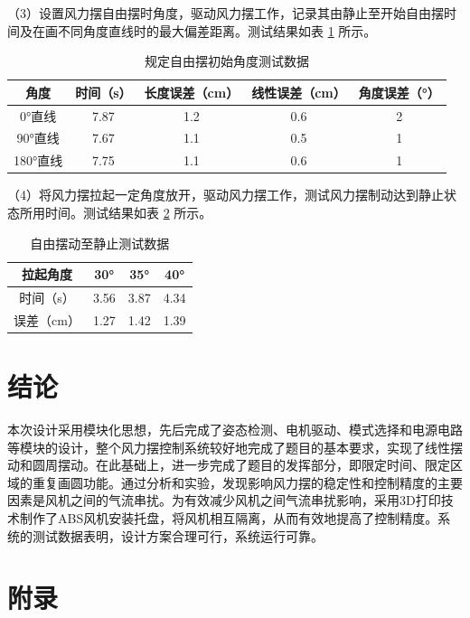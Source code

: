 \documentclass[zihao=-4,fontset=none]{ctexart}
\begin{document}
（3）设置风力摆自由摆时角度，驱动风力摆工作，记录其由静止至开始自由摆时间及在画不同角度直线时的最大偏差距离。测试结果如表 \ref{tab:angle} 所示。

\begin{table}[H]
    \centering
    \caption{规定自由摆初始角度测试数据}
    \label{tab:angle}
    \begin{tabular}{ccccc}
        \toprule
        角度 & 时间（s） & 长度误差（cm） & 线性误差（cm） & 角度误差（°） \\
        \midrule
        0°直线 & 7.87 & 1.2 & 0.6 & 2 \\
        90°直线 & 7.67 & 1.1 & 0.5 & 1 \\
        180°直线 & 7.75 & 1.1 & 0.6 & 1 \\
        \bottomrule
    \end{tabular}
\end{table}

（4）将风力摆拉起一定角度放开，驱动风力摆工作，测试风力摆制动达到静止状态所用时间。测试结果如表 \ref{tab:stop} 所示。

\begin{table}[H]
    \centering
    \caption{自由摆动至静止测试数据}
    \label{tab:stop}
    \begin{tabular}{cccc}
        \toprule
        拉起角度 & 30° & 35° & 40° \\
        \midrule
        时间（s） & 3.56 & 3.87 & 4.34 \\
        误差（cm） & 1.27 & 1.42 & 1.39 \\
        \bottomrule
    \end{tabular}
\end{table}

\section{结论}

本次设计采用模块化思想，先后完成了姿态检测、电机驱动、模式选择和电源电路等模块的设计，整个风力摆控制系统较好地完成了题目的基本要求，实现了线性摆动和圆周摆动。在此基础上，进一步完成了题目的发挥部分，即限定时间、限定区域的重复画圆功能。通过分析和实验，发现影响风力摆的稳定性和控制精度的主要因素是风机之间的气流串扰。为有效减少风机之间气流串扰影响，采用3D打印技术制作了ABS风机安装托盘，将风机相互隔离，从而有效地提高了控制精度。系统的测试数据表明，设计方案合理可行，系统运行可靠。

\section*{附录}
\end{document}
